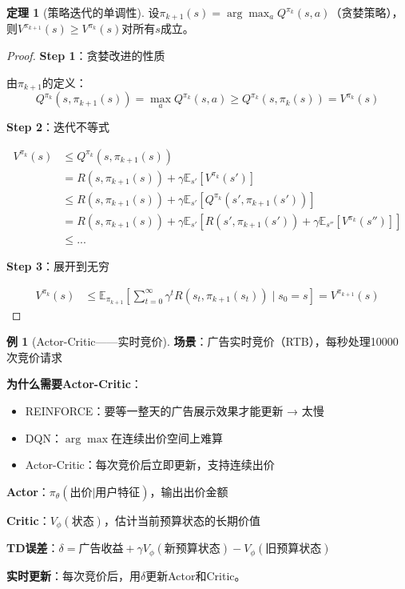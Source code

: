 \documentclass[11pt,a4paper]{article}
\theoremstyle{definition}
\newtheorem{example}{例}[section]
\newtheorem{theorem}{定理}[section]
\begin{document}
\begin{theorem}[策略迭代的单调性]
设$\pi_{k+1}(s) = \arg\max_a Q^{\pi_k}(s,a)$（贪婪策略），则$V^{\pi_{k+1}}(s) \geq V^{\pi_k}(s)$对所有$s$成立。
\end{theorem}

\begin{proof}
\textbf{Step 1}：贪婪改进的性质

由$\pi_{k+1}$的定义：
\[
Q^{\pi_k}(s, \pi_{k+1}(s)) = \max_a Q^{\pi_k}(s, a) \geq Q^{\pi_k}(s, \pi_k(s)) = V^{\pi_k}(s)
\]

\textbf{Step 2}：迭代不等式

\begin{align*}
V^{\pi_k}(s) &\leq Q^{\pi_k}(s, \pi_{k+1}(s)) \\
&= R(s, \pi_{k+1}(s)) + \gamma \mathbb{E}_{s'}[V^{\pi_k}(s')] \\
&\leq R(s, \pi_{k+1}(s)) + \gamma \mathbb{E}_{s'}[Q^{\pi_k}(s', \pi_{k+1}(s'))] \\
&= R(s, \pi_{k+1}(s)) + \gamma \mathbb{E}_{s'}[R(s', \pi_{k+1}(s')) + \gamma \mathbb{E}_{s''}[V^{\pi_k}(s'')]] \\
&\leq ...
\end{align*}

\textbf{Step 3}：展开到无穷

\begin{align*}
V^{\pi_k}(s) &\leq \mathbb{E}_{\pi_{k+1}}\left[\sum_{t=0}^\infty \gamma^t R(s_t, \pi_{k+1}(s_t)) \mid s_0 = s\right] = V^{\pi_{k+1}}(s)
\end{align*}
\end{proof}

\begin{example}[Actor-Critic——实时竞价]
\textbf{场景}：广告实时竞价（RTB），每秒处理10000次竞价请求

\textbf{为什么需要Actor-Critic}：
\begin{itemize}
    \item REINFORCE：要等一整天的广告展示效果才能更新 → 太慢
    \item DQN：$\arg\max$在连续出价空间上难算
    \item Actor-Critic：每次竞价后立即更新，支持连续出价
\end{itemize}

\textbf{Actor}：$\pi_\theta(\text{出价}|\text{用户特征})$，输出出价金额

\textbf{Critic}：$V_\phi(\text{状态})$，估计当前预算状态的长期价值

\textbf{TD误差}：$\delta = \text{广告收益} + \gamma V_\phi(\text{新预算状态}) - V_\phi(\text{旧预算状态})$

\textbf{实时更新}：每次竞价后，用$\delta$更新Actor和Critic。
\end{example}
\end{document}
